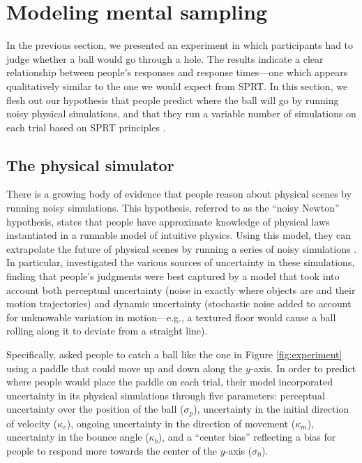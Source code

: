 \documentclass[10pt,letterpaper]{article}
\begin{document}
\section{Modeling mental sampling}

In the previous section, we presented an experiment in which participants had to judge whether a ball would go through a hole.
The results indicate a clear relationship between people's responses and response times---one which appears qualitatively similar to the one we would expect from SPRT.
In this section, we flesh out our hypothesis that people predict where the ball will go by running noisy physical simulations, and that they run a variable number of simulations on each trial based on SPRT principles \cite{wald1947sequential}.

\subsection{The physical simulator}

There is a growing body of evidence that people reason about physical scenes by running noisy simulations.
This hypothesis, referred to as the ``noisy Newton'' hypothesis, states that people have approximate knowledge of physical laws instantiated in a runnable model of intuitive physics.
Using this model, they can extrapolate the future of physical scenes by running a series of noisy simulations \cite{Smith:2013fc,Battaglia2013,Smith:2013ug,Smith:2013th,Smith:2014tx,Ullman:2014ut,Hamrick:2015}.
In particular,  investigated the various sources of uncertainty in these simulations, finding that people's judgments were best captured by a model that took into account both perceptual uncertainty (noise in exactly where objects are and their motion trajectories) and dynamic uncertainty (stochastic noise added to account for unknowable variation in motion---e.g., a textured floor would cause a ball rolling along it to deviate from a straight line).

Specifically,  asked people to catch a ball like the one in Figure \ref{fig:experiment} using a paddle that could move up and down along the $y$-axis.
In order to predict where people would place the paddle on each trial, their model incorporated uncertainty in its physical simulations through five parameters: perceptual uncertainty over the position of the ball ($\sigma_p$), uncertainty in the initial direction of velocity ($\kappa_v$), ongoing uncertainty in the direction of movement ($\kappa_m$), uncertainty in the bounce angle ($\kappa_b$), and a ``center bias'' reflecting a bias for people to respond more towards the center of the $y$-axis ($\sigma_0$).
\end{document}
